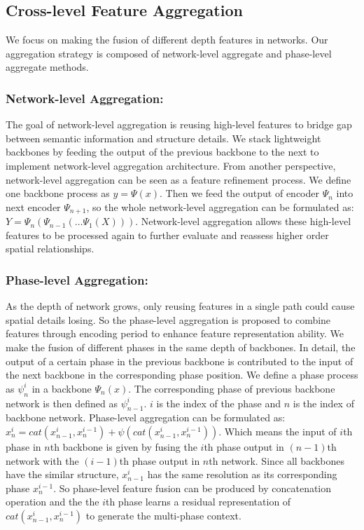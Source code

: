 \documentclass[journal]{IEEEtran}
\begin{document}
\subsection{Cross-level Feature Aggregation}
We focus on making the fusion of different depth features in networks. Our aggregation strategy is composed of network-level aggregate and phase-level aggregate methods.
\subsubsection{Network-level Aggregation:} The goal of network-level aggregation is reusing high-level features to bridge gap between semantic information and structure details. We stack lightweight backbones by feeding the output of the previous backbone to the next to implement network-level aggregation architecture.  From another perspective, network-level aggregation can be seen as a feature refinement process. We define one backbone process as 
$y=\Psi(x)$. Then we feed the output of encoder $\Psi_{n}$ into next encoder $\Psi_{n+1}$, so the whole network-level aggregation can be formulated as: $Y=\Psi_{n}(\Psi_{n-1}(\dots\Psi_{1}(X)))$.
Network-level aggregation allows these high-level features to be processed again to further evaluate and reassess higher order spatial relationships.
\subsubsection{Phase-level Aggregation:}
As the depth of network grows, only reusing features in a single path could cause  spatial details losing. So the phase-level aggregation is proposed to combine features through encoding period to enhance feature representation ability.  
We make the fusion of different phases in the same depth of backbones. In detail, the output of a certain phase in the previous backbone is contributed to the input of the next backbone in the corresponding phase position. We define a phase process as $\psi_{n}^{i}$ in a backbone $\Psi_{n}(x)$. The corresponding phase of previous backbone network is then defined as $\psi_{n-1}^{i}$. $i$ is the index of the phase and $n$ is the index of backbone network.
Phase-level aggregation can be formulated as:
$x_{n}^{i}=cat(x_{n-1}^{i},x_{n}^{i-1})+\psi(cat(x_{n-1}^{i},x_{n}^{i-1}))$.
Which means the input of $i$th phase in $n$th backbone is given by fusing the $i$th phase output in $(n-1)$th network with the $(i-1)$th phase output in $n$th network. 
Since all backbones have the similar structure, $x_{n-1}^{i}$ has the same  resolution as its corresponding phase $x_{n}^{i-1}$. So phase-level feature fusion
can be produced by concatenation operation and the the $i$th phase learns a residual representation of $cat(x_{n-1}^{i},x_{n}^{i-1})$ to generate the multi-phase context. 
\end{document}
